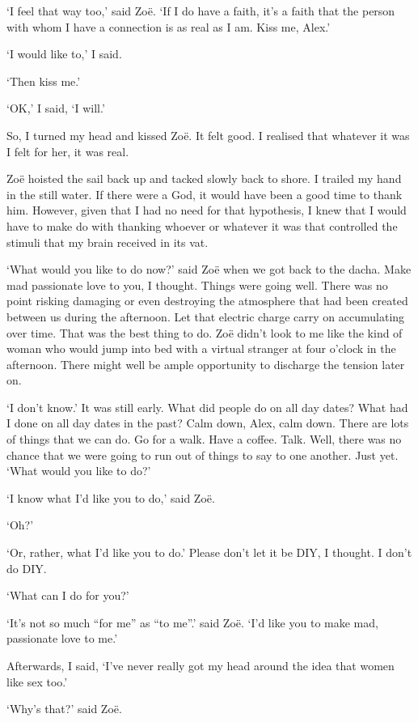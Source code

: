 `I feel that way too,' said Zoë. `If I do have a faith, it's a
faith that the person with whom I have a connection is as real as I
am. Kiss me, Alex.'

`I would like to,' I said.

`Then kiss me.'

`OK,' I said, `I will.'

So, I turned my head and kissed Zoë. It felt good. I realised
that whatever it was I felt for her, it was real.

Zoë hoisted the sail back up and tacked slowly back to shore. I
trailed my hand in the still water. If there were a God, it would
have been a good time to thank him. However, given that I had no
need for that hypothesis, I knew that I would have to make do with
thanking whoever or whatever it was that controlled the stimuli that
my brain received in its vat.

`What would you like to do now?' said Zoë when we got back to
the dacha. Make mad passionate love to you, I thought. Things were
going well. There was no point risking damaging or even destroying
the atmosphere that had been created between us during the
afternoon. Let that electric charge carry on accumulating over time.
That was the best thing to do. Zoë didn't look to me like the
kind of woman who would jump into bed with a virtual stranger at
four o'clock in the afternoon. There might well be ample opportunity
to discharge the tension later on.

`I don't know.' It was still early. What did people do on all day
dates? What had I done on all day dates in the past? Calm down,
Alex, calm down. There are lots of things that we can do. Go for a
walk. Have a coffee. Talk. Well, there was no chance that we were going to run out
of things to say to one another. Just yet. `What would you like to
do?'

`I know what I'd like you to do,' said Zoë.

`Oh?'

`Or, rather, what I'd like you to do.' Please don't let it be DIY, I
thought. I don't do DIY.

`What can I do for you?'

`It's not so much ``for me'' as ``to me''.' said Zoë. `I'd like
you to make mad, passionate love to me.'

Afterwards, I said, `I've never really got my head around the idea
that women like sex too.'

`Why's that?' said Zoë.

